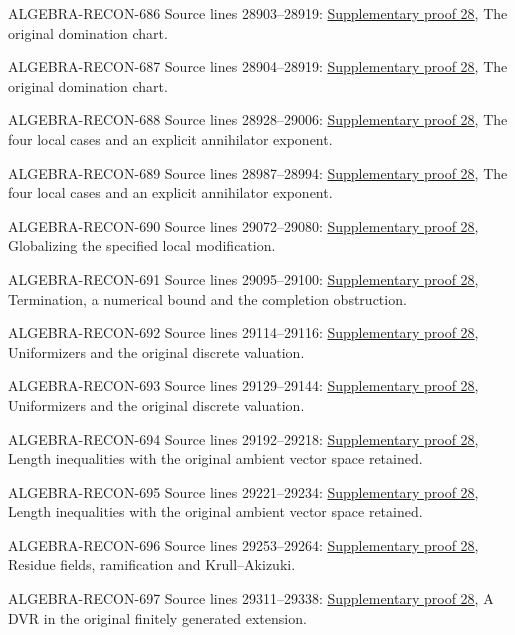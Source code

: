\begin{AlgebraSourceRoutes}
\item[ALGEBRA-RECON-686] Source lines 28903--28919: \hyperlink{algebra_krull_akizuki_notes_20260928}{Supplementary proof 28}, The original domination chart.
\item[ALGEBRA-RECON-687] Source lines 28904--28919: \hyperlink{algebra_krull_akizuki_notes_20260928}{Supplementary proof 28}, The original domination chart.
\item[ALGEBRA-RECON-688] Source lines 28928--29006: \hyperlink{algebra_krull_akizuki_notes_20260928}{Supplementary proof 28}, The four local cases and an explicit annihilator exponent.
\item[ALGEBRA-RECON-689] Source lines 28987--28994: \hyperlink{algebra_krull_akizuki_notes_20260928}{Supplementary proof 28}, The four local cases and an explicit annihilator exponent.
\item[ALGEBRA-RECON-690] Source lines 29072--29080: \hyperlink{algebra_krull_akizuki_notes_20260928}{Supplementary proof 28}, Globalizing the specified local modification.
\item[ALGEBRA-RECON-691] Source lines 29095--29100: \hyperlink{algebra_krull_akizuki_notes_20260928}{Supplementary proof 28}, Termination, a numerical bound and the completion obstruction.
\item[ALGEBRA-RECON-692] Source lines 29114--29116: \hyperlink{algebra_krull_akizuki_notes_20260928}{Supplementary proof 28}, Uniformizers and the original discrete valuation.
\item[ALGEBRA-RECON-693] Source lines 29129--29144: \hyperlink{algebra_krull_akizuki_notes_20260928}{Supplementary proof 28}, Uniformizers and the original discrete valuation.
\item[ALGEBRA-RECON-694] Source lines 29192--29218: \hyperlink{algebra_krull_akizuki_notes_20260928}{Supplementary proof 28}, Length inequalities with the original ambient vector space retained.
\item[ALGEBRA-RECON-695] Source lines 29221--29234: \hyperlink{algebra_krull_akizuki_notes_20260928}{Supplementary proof 28}, Length inequalities with the original ambient vector space retained.
\item[ALGEBRA-RECON-696] Source lines 29253--29264: \hyperlink{algebra_krull_akizuki_notes_20260928}{Supplementary proof 28}, Residue fields, ramification and Krull–Akizuki.
\item[ALGEBRA-RECON-697] Source lines 29311--29338: \hyperlink{algebra_krull_akizuki_notes_20260928}{Supplementary proof 28}, A DVR in the original finitely generated extension.

\end{AlgebraSourceRoutes}
